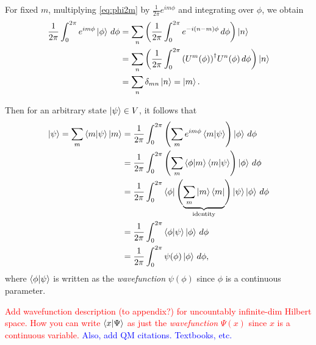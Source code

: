     For fixed $m$, multiplying \cref{eq:phi2m} by $\frac{1}{2\pi} e^{im\phi}$ and integrating over $\phi$, we obtain
    \begin{align*}
        \frac{1}{2\pi}\int_{0}^{2\pi} e^{im\phi}\ket{\phi} \,d\phi 
            &= \sum_n \left( \frac{1}{2\pi}\int_{0}^{2\pi}e^{-i(n-m)\phi}\,d\phi \right)\ket{n} \\
            &= \sum_n \left( \frac{1}{2\pi}\int_{0}^{2\pi}{(U^m(\phi))}^\dagger U^n(\phi)\,d\phi \right)\ket{n} \\
            &= \sum_n \delta_{mn}\ket{n} = \ket{m}.
    \end{align*}

    Then for an arbitrary state $\ket{\psi}\in V$, it follows that
    \begin{align*}
        \ket{\psi} = \sum_m \braket{m|\psi}\ket{m} 
            &= \frac{1}{2\pi}\int_{0}^{2\pi} \left( \sum_m e^{im\phi}\braket{m|\psi} \right)\ket{\phi} \,d\phi \\
            &= \frac{1}{2\pi}\int_{0}^{2\pi} \left( \sum_m \braket{\phi|m}\braket{m|\psi} \right)\ket{\phi} \,d\phi \\
            &= \frac{1}{2\pi}\int_{0}^{2\pi} \bra{\phi}\Biggl( \underbrace{\sum_m \ket{m}\bra{m}}_{\textrm{identity}} \Biggr)\ket{\psi}\ket{\phi} \,d\phi \\
            &= \frac{1}{2\pi}\int_{0}^{2\pi} \braket{\phi|\psi}\ket{\phi} \,d\phi \\
            &= \frac{1}{2\pi}\int_{0}^{2\pi} \psi(\phi)\ket{\phi} \,d\phi,
    \end{align*}
    where $\braket{\phi|\psi}$ is written as the \textit{wavefunction} $\psi(\phi)$ since $\phi$ is a continuous parameter.

    \textcolor{red}{Add wavefunction description (to appendix?) for uncountably infinite-dim Hilbert space. How you can write $\braket{x|\Psi}$ as just the \textit{wavefunction} $\Psi(x)$ since $x$ is a continuous variable.} \textcolor{blue}{Also, add QM citations. Textbooks, etc.}

